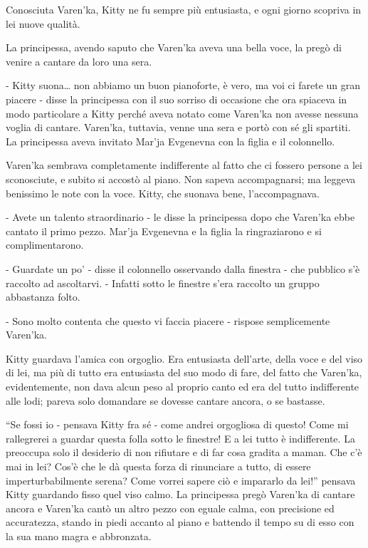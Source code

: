 Conosciuta Varen'ka, Kitty ne fu sempre più entusiasta, e ogni giorno scopriva in lei nuove qualità. 

La principessa, avendo saputo che Varen'ka aveva una bella voce, la pregò di venire a cantare da loro una sera. 

- Kitty suona\ldots{} non abbiamo un buon pianoforte, è vero, ma voi ci farete un gran piacere - disse la principessa con il suo sorriso di occasione che ora spiaceva in modo particolare a Kitty perché aveva notato come Varen'ka non avesse nessuna voglia di cantare. Varen'ka, tuttavia, venne una sera e portò con sé gli spartiti. La principessa aveva invitato Mar'ja Evgenevna con la figlia e il colonnello. 

Varen'ka sembrava completamente indifferente al fatto che ci fossero persone a lei sconosciute, e subito si accostò al piano. Non sapeva accompagnarsi; ma leggeva benissimo le note con la voce. Kitty, che suonava bene, l'accompagnava. 

- Avete un talento straordinario - le disse la principessa dopo che Varen'ka ebbe cantato il primo pezzo. Mar'ja Evgenevna e la figlia la ringraziarono e si complimentarono. 

- Guardate un po' - disse il colonnello osservando dalla finestra - che pubblico s'è raccolto ad ascoltarvi. - Infatti sotto le finestre s'era raccolto un gruppo abbastanza folto. 

- Sono molto contenta che questo vi faccia piacere - rispose semplicemente Varen'ka. 

Kitty guardava l'amica con orgoglio. Era entusiasta dell'arte, della voce e del viso di lei, ma più di tutto era entusiasta del suo modo di fare, del fatto che Varen'ka, evidentemente, non dava alcun peso al proprio canto ed era del tutto indifferente alle lodi; pareva solo domandare se dovesse cantare ancora, o se bastasse. 

``Se fossi io - pensava Kitty fra sé - come andrei orgogliosa di questo! Come mi rallegrerei a guardar questa folla sotto le finestre! E a lei tutto è indifferente. La preoccupa solo il desiderio di non rifiutare e di far cosa gradita a maman. Che c'è mai in lei? Cos'è che le dà questa forza di rinunciare a tutto, di essere imperturbabilmente serena? Come vorrei sapere ciò e impararlo da lei!'' pensava Kitty guardando fisso quel viso calmo. La principessa pregò Varen'ka di cantare ancora e Varen'ka cantò un altro pezzo con eguale calma, con precisione ed accuratezza, stando in piedi accanto al piano e battendo il tempo su di esso con la sua mano magra e abbronzata. 

